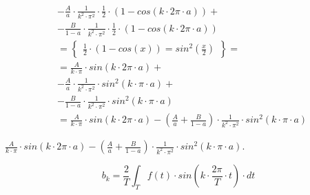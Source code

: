 \begin{task}
\begin{align*}
& - \frac{A}{a}  \cdot \frac{1}{k^2 \cdot \pi^2} \cdot \frac{1}{2} \cdot \left(1 -cos\left(k \cdot 2\pi \cdot a \right)\right) + \\
& - \frac{B}{1-a} \cdot \frac{1}{k^2 \cdot \pi^2} \cdot \frac{1}{2} \cdot \left(1 - cos\left( k \cdot 2\pi \cdot a \right) \right)\\
&=\left\{\begin{array}{ll}
\frac{1}{2}\cdot \left(1 - cos\left( x\right)\right) = sin^2\left(\frac{x}{2}\right) 
\end{array}\right\}=\\
&= \frac{A}{k \cdot \pi} \cdot sin\left( k \cdot 2\pi \cdot a\right) + \\
& - \frac{A}{a}  \cdot \frac{1}{k^2 \cdot \pi^2} \cdot sin^2\left(k \cdot \pi \cdot a \right) + \\
& - \frac{B}{1-a} \cdot \frac{1}{k^2 \cdot \pi^2} \cdot sin^2\left( k \cdot \pi \cdot a \right)\\
&= \frac{A}{k \cdot \pi} \cdot sin\left( k \cdot 2\pi \cdot a\right) - \left( \frac{A}{a} + \frac{B}{1-a}\right) \cdot \frac{1}{k^2 \cdot \pi^2} \cdot sin^2\left(k \cdot \pi \cdot a \right)
\end{align*}

 $\frac{A}{k \cdot \pi} \cdot sin\left( k \cdot 2\pi \cdot a\right) - \left( \frac{A}{a} + \frac{B}{1-a}\right) \cdot \frac{1}{k^2 \cdot \pi^2} \cdot sin^2\left(k \cdot \pi \cdot a \right)$.


\begin{equation}
b_k=\frac{2}{T}\int_{T}f(t) \cdot sin\left( k \cdot \frac{2\pi}{T} \cdot t\right) \cdot dt
\end{equation}



\end{task}
